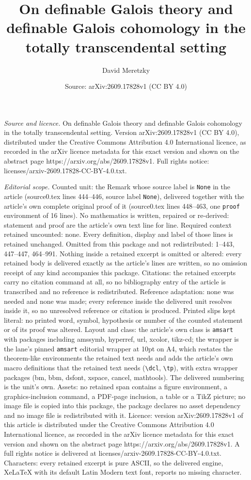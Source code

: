 \documentclass[10pt,a4paper]{amsart}
\title[On definable Galois theory and definable Galois cohomology i]{On definable Galois theory and definable Galois cohomology in the totally transcendental setting}
\author{David Meretzky}
\date{Source: arXiv:2609.17828v1 (CC BY 4.0)}
\begin{document}
\maketitle

\noindent\emph{Source and licence.} On definable Galois theory and definable Galois cohomology in the totally transcendental setting. Version arXiv:2609.17828v1 (CC BY 4.0), distributed under the Creative Commons Attribution 4.0 International licence, as recorded in the arXiv licence metadata for this exact version and shown on the abstract page https://arxiv.org/abs/2609.17828v1. Full rights notice: licenses/arxiv-2609.17828-CC-BY-4.0.txt.\par\smallskip

\noindent\textit{Editorial scope.} Counted unit: the Remark whose source label is \texttt{None} in the article (source0.tex lines 444--446, source label \texttt{None}), delivered together with the article's own complete original proof of it (source0.tex lines 448--463, one \texttt{proof} environment of 16 lines). No mathematics is written, repaired or re-derived: statement and proof are the article's own text line for line. Required context retained uncounted: none. Every definition, display and label of those lines is retained unchanged. Omitted from this package and not redistributed: 1--443, 447--447, 464--991. Nothing inside a retained excerpt is omitted or altered: every retained body is delivered exactly as the article's lines are written, so no omission receipt of any kind accompanies this package. Citations: the retained excerpts carry no citation command at all, so no bibliography entry of the article is transcribed and no reference is redistributed. Reference adaptation: none was needed and none was made; every reference inside the delivered unit resolves inside it, so no unresolved reference or citation is produced. Printed slips kept literal: no printed word, symbol, hypothesis or number of the counted statement or of its proof was altered. Layout and class: the article's own class is \texttt{amsart} with packages including amssymb, hyperref, url, xcolor, tikz-cd; the wrapper is the lane's pinned \texttt{amsart} editorial wrapper at 10pt on A4, which restates the theorem-like environments the retained text needs and adds the article's own macro definitions that the retained text needs (\texttt{\textbackslash dcl}, \texttt{\textbackslash tp}), with extra wrapper packages (bm, bbm, dsfont, xspace, cancel, mathtools). The delivered numbering is the unit's own. Assets: no retained span contains a figure environment, a graphics-inclusion command, a PDF-page inclusion, a table or a TikZ picture; no image file is copied into this package, the package declares no asset dependency and no image file is redistributed with it. Licence: version arXiv:2609.17828v1 of this article is distributed under the Creative Commons Attribution 4.0 International licence, as recorded in the arXiv licence metadata for this exact version and shown on the abstract page https://arxiv.org/abs/2609.17828v1. A full rights notice is delivered at licenses/arxiv-2609.17828-CC-BY-4.0.txt. Characters: every retained excerpt is pure ASCII, so the delivered engine, XeLaTeX with its default Latin Modern text font, reports no missing character.
\end{document}
